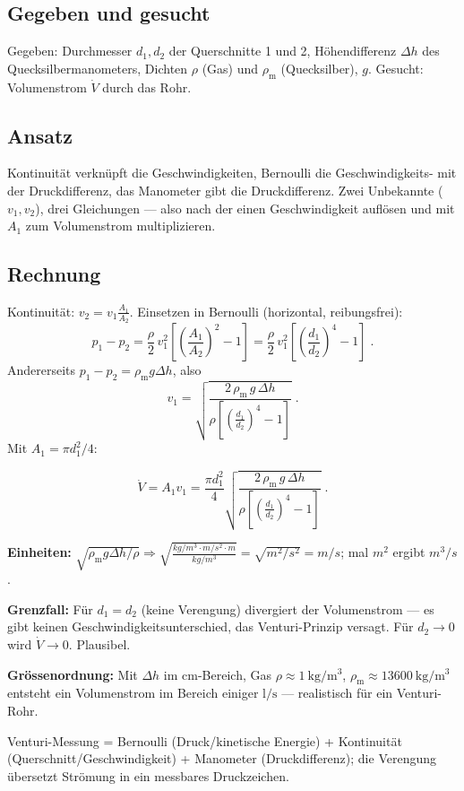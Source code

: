 
\subsection*{Gegeben und gesucht}
Gegeben: Durchmesser $d_1,d_2$ der Querschnitte 1 und 2, Höhendifferenz
$\Delta h$ des Quecksilbermanometers, Dichten $\rho$ (Gas) und
$\rho_\mathrm{m}$ (Quecksilber), $g$.
Gesucht: Volumenstrom $\dot V$ durch das Rohr.

\subsection*{Ansatz}
Kontinuität verknüpft die Geschwindigkeiten, Bernoulli die Geschwindigkeits-
mit der Druckdifferenz, das Manometer gibt die Druckdifferenz. Zwei
Unbekannte ($v_1,v_2$), drei Gleichungen --- also nach der einen Geschwindigkeit
auflösen und mit $A_1$ zum Volumenstrom multiplizieren.

\subsection*{Rechnung}
Kontinuität: $v_2 = v_1\frac{A_1}{A_2}$. Einsetzen in Bernoulli
(horizontal, reibungsfrei):
\begin{equation}
  p_1-p_2=\frac{\rho}{2}\,v_1^2\left[\left(\frac{A_1}{A_2}\right)^2-1\right]
  =\frac{\rho}{2}\,v_1^2\left[\left(\frac{d_1}{d_2}\right)^4-1\right]\;.
\end{equation}
Andererseits $p_1-p_2=\rho_\mathrm{m}g\Delta h$, also
\begin{equation}
  v_1=\sqrt{\frac{2\,\rho_\mathrm{m}\,g\,\Delta h}
        {\rho\left[\left(\frac{d_1}{d_2}\right)^4-1\right]}}\;.
\end{equation}
Mit $A_1=\pi d_1^2/4$:

\begin{ergebnis}
\begin{equation*}
  \dot V = A_1 v_1
  =\frac{\pi d_1^2}{4}
   \sqrt{\frac{2\,\rho_\mathrm{m}\,g\,\Delta h}
        {\rho\left[\left(\frac{d_1}{d_2}\right)^4-1\right]}}\;.
\end{equation*}
\end{ergebnis}

\begin{kontrolle}
\textbf{Einheiten:} $\sqrt{\rho_\mathrm{m}g\Delta h/\rho}
\Rightarrow\sqrt{\frac{kg/m^3\cdot m/s^2\cdot m}{kg/m^3}}
=\sqrt{m^2/s^2}=m/s$; mal $m^2$ ergibt $m^3/s$. \checkmark

\textbf{Grenzfall:} Für $d_1=d_2$ (keine Verengung) divergiert der
Volumenstrom --- es gibt keinen Geschwindigkeitsunterschied, das Venturi-Prinzip
versagt. Für $d_2\to 0$ wird $\dot V\to 0$. Plausibel.

\textbf{Grössenordnung:} Mit $\Delta h$ im \unit{\centi\metre}-Bereich, Gas
$\rho\!\approx\!\qty{1}{\kg\per\cubic\metre}$, $\rho_\mathrm{m}\!\approx\!\qty{13600}{\kg\per\cubic\metre}$
entsteht ein Volumenstrom im Bereich einiger $\unit{\litre\per\second}$
--- realistisch für ein Venturi-Rohr.
\end{kontrolle}

\begin{merksatz}
Venturi-Messung = Bernoulli (Druck/kinetische Energie) + Kontinuität
(Querschnitt/Geschwindigkeit) + Manometer (Druckdifferenz); die Verengung
übersetzt Strömung in ein messbares Druckzeichen.
\end{merksatz}
